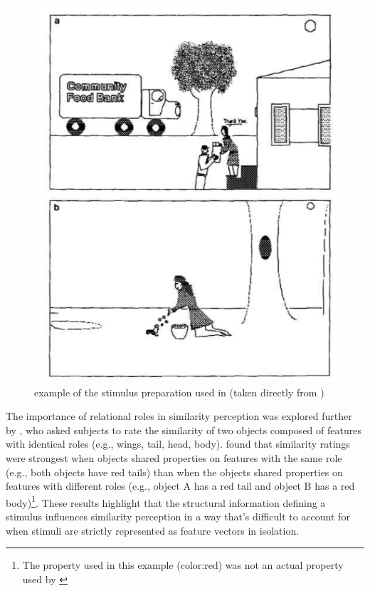\documentclass[12pt]{article}
\let\oldcite=\cite
\let\oldtextcite=\textcite
\renewcommand{\cite}[1]{\textcolor[rgb]{0, .121, .388}{\oldcite{#1}}}
\renewcommand{\textcite}[1]{\textcolor[rgb]{0, .121, .388}{\oldtextcite{#1}}}
\begin{document}
\begin{figure}[h]
    \centering
    \label{fig:markman1993}
    \includegraphics[scale=.6]{figures/markman1993.png}
    \caption{example of the stimulus preparation used in \textcite{markman1993structural} (taken directly from \cite{markman1993structural})}
\end{figure}


The importance of relational roles in similarity perception was explored further by \textcite{goldstone1994similarity}, who asked subjects to rate the similarity of two objects composed of features with identical roles (e.g., wings, tail, head, body). \textcite{goldstone1994similarity} found that similarity ratings were strongest when objects shared properties on features with the same role (e.g., both objects have red tails) than when the objects shared properties on features with different roles (e.g., object A has a red tail and object B has a red body)\footnote{The property used in this example (color:red) was not an actual property used by \textcite{goldstone1994similarity}}. These results highlight that the structural information defining a stimulus influences similarity perception in a way that's difficult to account for when stimuli are strictly represented as feature vectors in isolation. 
\end{document}
